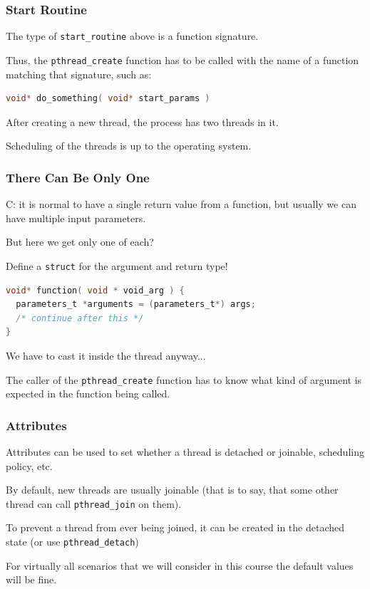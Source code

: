 \begin{frame}[fragile]
	\frametitle{Start Routine}

	The type of \texttt{start\_routine} above is a function signature.

	Thus, the \texttt{pthread\_create} function has to be called with the name of a function matching that signature, such as:

	\begin{lstlisting}[language=C]
void* do_something( void* start_params )
\end{lstlisting}

	After creating a new thread, the process has two threads in it.

	Scheduling of the threads is up to the operating system.

\end{frame}


\begin{frame}[fragile]
	\frametitle{There Can Be Only One}

	C: it is normal to have a single return value from a function, but usually we can have multiple input parameters.

	But here we get only one of each?

	Define a \texttt{struct} for the argument and return type!

	\begin{lstlisting}[language=C]
void* function( void * void_arg ) {
  parameters_t *arguments = (parameters_t*) args;
  /* continue after this */
}
\end{lstlisting}

	We have to cast it inside the thread anyway...

	The caller of the \texttt{pthread\_create} function has to know what kind of argument is expected in the function being called.

\end{frame}


\begin{frame}
	\frametitle{Attributes}

	Attributes can be used to set whether a thread is detached or joinable, scheduling policy, etc.

	By default, new threads are usually joinable (that is to say, that some other thread can call \texttt{pthread\_join} on them).

	To prevent a thread from ever being joined, it can be created in the detached state (or use \texttt{pthread\_detach})

	For virtually all scenarios that we will consider in this course the default values will be fine.

\end{frame}

